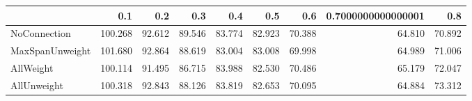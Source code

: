 \begin{tabular}{lrrrrrrrr}
\toprule
{} &     0.1 &    0.2 &    0.3 &    0.4 &    0.5 &    0.6 & 0.7000000000000001 &    0.8 \\
\midrule
NoConnection    & 100.268 & 92.612 & 89.546 & 83.774 & 82.923 & 70.388 &             64.810 & 70.892 \\
MaxSpanUnweight & 101.680 & 92.864 & 88.619 & 83.004 & 83.008 & 69.998 &             64.989 & 71.006 \\
AllWeight       & 100.114 & 91.495 & 86.715 & 83.988 & 82.530 & 70.486 &             65.179 & 72.047 \\
AllUnweight     & 100.318 & 92.843 & 88.126 & 83.819 & 82.653 & 70.095 &             64.884 & 73.312 \\
\bottomrule
\end{tabular}
